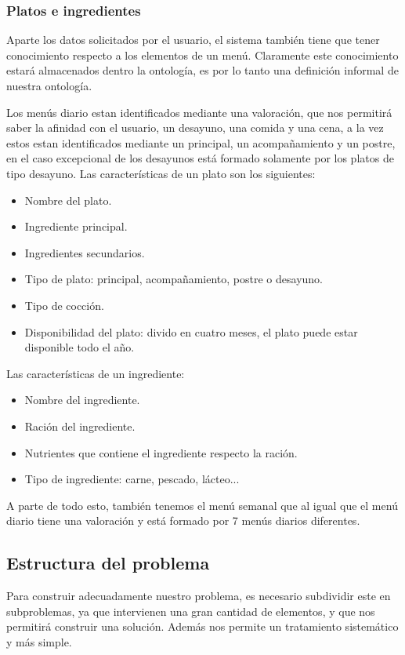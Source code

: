 \documentclass[11pt]{article}
\begin{document}
\subsubsection{Platos e ingredientes}

Aparte los datos solicitados por el usuario, el sistema también tiene que tener conocimiento respecto a los elementos de un menú. Claramente este conocimiento estará almacenados dentro la ontología, es por lo tanto una definición informal de nuestra ontología.

Los menús diario estan identificados mediante una valoración, que nos permitirá saber la afinidad con el usuario, un desayuno, una comida y una cena, a la vez estos estan identificados mediante un principal, un acompañamiento y un postre, en el caso excepcional de los desayunos está formado solamente por los platos de tipo desayuno. Las características de un plato son los siguientes:
\begin{itemize}
    \item Nombre del plato.
    \item Ingrediente principal.
    \item Ingredientes secundarios.
    \item Tipo de plato: principal, acompañamiento, postre o desayuno.
    \item Tipo de cocción.
    \item Disponibilidad del plato: divido en cuatro meses, el plato puede estar disponible todo el año.
\end{itemize}

Las características de un ingrediente:
\begin{itemize}
    \item Nombre del ingrediente.
    \item Ración del ingrediente.
    \item Nutrientes que contiene el ingrediente respecto la ración.
    \item Tipo de ingrediente: carne, pescado, lácteo...
\end{itemize}

A parte de todo esto, también tenemos el menú semanal que al igual que el menú diario tiene una valoración y está formado por 7 menús diarios diferentes.

\subsection{Estructura del problema}

Para construir adecuadamente nuestro problema, es necesario subdividir este en subproblemas, ya que intervienen una gran cantidad de elementos, y que nos permitirá construir una solución. Además nos permite un tratamiento sistemático y más simple.
\end{document}
